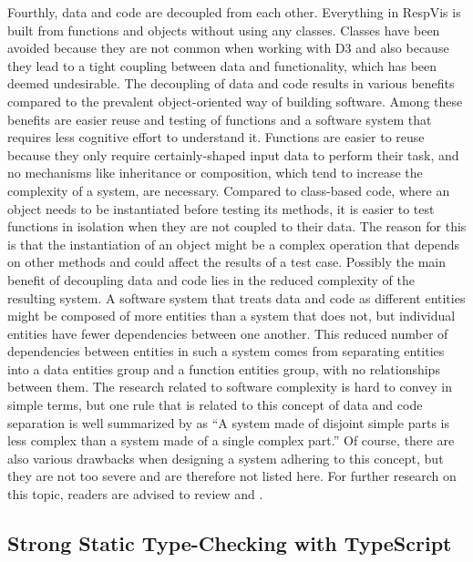 Fourthly, data and code are decoupled from each other.  Everything in
RespVis is built from functions and objects without using any classes.
Classes have been avoided because they are not common when working
with D3 and also because they lead to a tight coupling between data
and functionality, which has been deemed undesirable.  The decoupling
of data and code results in various benefits compared to the prevalent
object-oriented way of building software.  Among these benefits are
easier reuse and testing of functions and a software system that
requires less cognitive effort to understand it.  Functions are easier
to reuse because they only require certainly-shaped input data to
perform their task, and no mechanisms like inheritance or composition,
which tend to increase the complexity of a system, are necessary.
Compared to class-based code, where an object needs to be instantiated
before testing its methods, it is easier to test functions in
isolation when they are not coupled to their data.  The reason for
this is that the instantiation of an object might be a complex
operation that depends on other methods and could affect the results
of a test case.  Possibly the main benefit of decoupling data and code
lies in the reduced complexity of the resulting system.  A software
system that treats data and code as different entities might be
composed of more entities than a system that does not, but individual
entities have fewer dependencies between one another.  This reduced
number of dependencies between entities in such a system comes from
separating entities into a data entities group and a function entities
group, with no relationships between them.  The research related to
software complexity is hard to convey in simple terms, but one rule
that is related to this concept of data and code separation is well
summarized by \textcite{DataCodeSeparation} as \enquote{A system made
  of disjoint simple parts is less complex than a system made of a
  single complex part.}  Of course, there are also various drawbacks
when designing a system adhering to this concept, but they are not too
severe and are therefore not listed here.  For further research on
this topic, readers are advised to review
\textcite{DataCodeSeparation} and \textcite{OutOfTarPit}.



\subsection{Strong Static Type-Checking with TypeScript}

